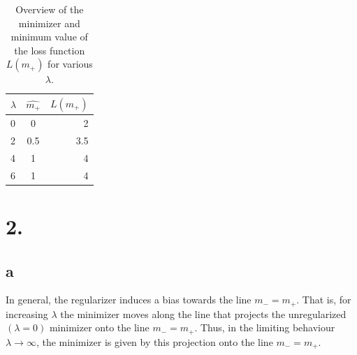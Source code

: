 \documentclass [a4paper] {report}
\begin{document}
	\begin{table}[H]		
		\centering
		\caption{Overview of the minimizer and minimum value of the loss function $L(m_{+})$ for various $\lambda$.}
		\label{table:loss_function}
		\begin{tabular}{l c r}
			$\lambda$ &  $\hat{m_{+}}$  & $L(\hat{m_{+}})$ \\
			\hline
			0 & 0   & 2 \\
			2 & 0.5 & 3.5 \\
			4 & 1   & 4 \\
			6 & 1   & 4 \\
		\end{tabular}
	\end{table}
	
	\section*{2.}
	\subsection*{a}
	In general, the regularizer induces a bias towards the line $m_{-} = m_{+}$. That is, for increasing $\lambda$ the minimizer moves along the line that projects the unregularized $(\lambda=0)$ minimizer onto the line $m_{-} = m_{+}$. Thus, in the limiting behaviour $\lambda \rightarrow \infty$, the minimizer is given by this projection onto the line $m_{-} = m_{+}$.
\end{document}
